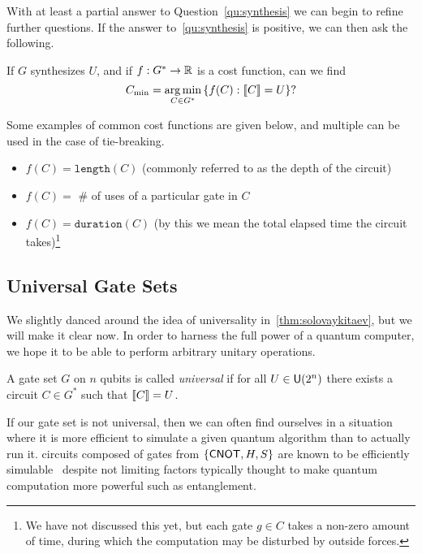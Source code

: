 With at least a partial answer to Question~\ref{qu:synthesis} we can begin to refine further questions.
If the answer to~\ref{qu:synthesis} is positive, we can then ask the following.
\begin{question}\label{qu:optimalsynthesis}
    If $G$ synthesizes $U$, and if $f: G^* \to \mathbb{R}$ is a cost function, can we find
    \begin{equation*}
        C_\text{min} = \operatorname*{arg\,min}_{C\in G^*} \qty{f(C) : \llbracket C\rrbracket = U}?
    \end{equation*}
\end{question}
Some examples of common cost functions are given below, and multiple can be used in the case of tie-breaking.
\begin{itemize}
    \item $f(C) = \mathtt{length}(C)$ (commonly referred to as the depth of the circuit)
    \item $f(C) = $ \# of uses of a particular gate in $C$
    \item $f(C) = \mathtt{duration}(C)$ (by this we mean the total elapsed time the circuit takes)\footnote{We have not discussed this yet, but each gate $g\in C$ takes a non-zero amount of time, during which the computation may be disturbed by outside forces.}
\end{itemize}

\subsection{Universal Gate Sets}

We slightly danced around the idea of universality in~\cref{thm:solovaykitaev}, but we will make it clear now.
In order to harness the full power of a quantum computer, we hope it to be able to perform arbitrary unitary operations.
\begin{definition}
    A gate set $G$ on $n$ qubits is called \emph{universal} if for all $U\in\mathsf{U} (2^n)$ there exists a circuit $C\in G^*$ such that $\llbracket C\rrbracket = U$.
\end{definition}
If our gate set is not universal, then we can often find ourselves in a situation where it is more efficient to simulate a given quantum algorithm than to actually run it.
\Eg{} circuits composed of gates from $\qty{\ensuremath{\mathsf{CNOT}}, H, S}$ are known to be efficiently simulable~\cite{gottesman-knill} despite not limiting factors typically thought to make quantum computation more powerful such as entanglement.

